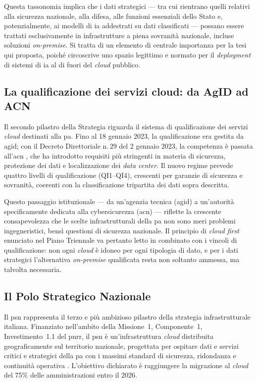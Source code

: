Questa tassonomia implica che i dati strategici --- tra cui rientrano quelli relativi alla sicurezza nazionale, alla difesa, alle funzioni essenziali dello Stato e, potenzialmente, ai modelli di \gls{ia} addestrati su dati classificati --- possano essere trattati esclusivamente in infrastrutture a piena sovranità nazionale, incluse soluzioni \textit{on-premise}. Si tratta di un elemento di centrale importanza per la tesi qui proposta, poiché circoscrive uno spazio legittimo e normato per il \textit{deployment} di sistemi di \gls{ia} al di fuori del \textit{cloud} pubblico.

\subsection{La qualificazione dei servizi cloud: da AgID ad ACN}

Il secondo pilastro della Strategia riguarda il sistema di qualificazione dei servizi \textit{cloud} destinati alla \gls{pa}. Fino al 18 gennaio 2023, la qualificazione era gestita da \gls{agid}; con il Decreto Direttoriale n.\,29 del 2 gennaio 2023, la competenza è passata all'\gls{acn} \parencite{ACNQualificazioneCloud}, che ha introdotto requisiti più stringenti in materia di sicurezza, protezione dei dati e localizzazione dei \textit{data center}. Il nuovo regime prevede quattro livelli di qualificazione (QI1--QI4), crescenti per garanzie di sicurezza e sovranità, coerenti con la classificazione tripartita dei dati sopra descritta.

Questo passaggio istituzionale --- da un'agenzia tecnica (\gls{agid}) a un'autorità specificamente dedicata alla cybersicurezza (\gls{acn}) --- riflette la crescente consapevolezza che le scelte infrastrutturali della \gls{pa} non sono meri problemi ingegneristici, bensì questioni di sicurezza nazionale. Il principio di \textit{cloud first} enunciato nel Piano Triennale \parencite{AgIDPianoTriennale2024} va pertanto letto in combinato con i vincoli di qualificazione: non ogni \textit{cloud} è idoneo per ogni tipologia di dato, e per i dati strategici l'alternativa \textit{on-premise} qualificata resta non soltanto ammessa, ma talvolta necessaria.

\subsection{Il Polo Strategico Nazionale}

Il \gls{psn} rappresenta il terzo e più ambizioso pilastro della strategia infrastrutturale italiana. Finanziato nell'ambito della Missione~1, Componente~1, Investimento~1.1 del \gls{pnrr}, il \gls{psn} è un'infrastruttura \textit{cloud} distribuita geograficamente sul territorio nazionale, progettata per ospitare dati e servizi critici e strategici della \gls{pa} con i massimi standard di sicurezza, ridondanza e continuità operativa \parencite{PNRR,PSN2024}. L'obiettivo dichiarato è raggiungere la migrazione al \textit{cloud} del 75\% delle amministrazioni entro il 2026.

